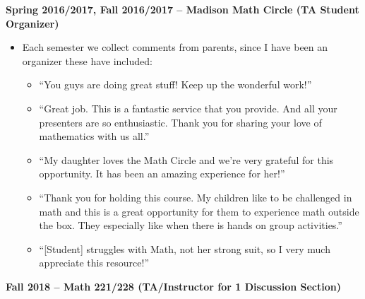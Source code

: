 \documentclass[letterpaper,11pt]{article}
\begin{document}
\textbf{Spring 2016/2017, Fall 2016/2017 -- Madison Math Circle (TA Student Organizer)}

\begin{itemize}
\item Each semester we collect comments from parents, since I have been an organizer these have included:
	\begin{itemize}
	\item ``You guys are doing great stuff!  Keep up the wonderful work!''
	\item ``Great job. This is a fantastic service that you provide. And all your presenters are so enthusiastic. Thank you for sharing your love of mathematics with us all.''
	\item ``My daughter loves the Math Circle and we're very grateful for this opportunity. It has been an amazing experience for her!''
	\item ``Thank you for holding this course. My children like to be challenged in math and this is a great opportunity for them to experience math outside the box. They especially like when there is hands on group activities.''
	\item ``[Student] struggles with Math, not her strong suit, so I very much appreciate this resource!''
	\end{itemize}
\end{itemize}

\textbf{Fall 2018 -- Math 221/228 (TA/Instructor for 1 Discussion Section)}
\end{document}
